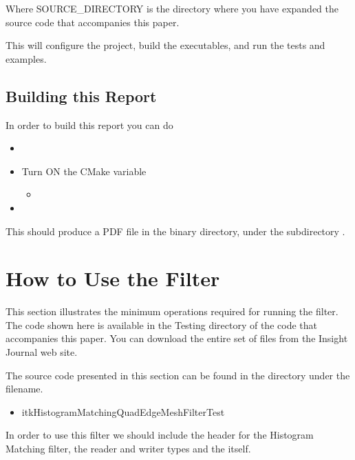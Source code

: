 \documentclass{InsightArticle}
\begin{document}
Where SOURCE\_DIRECTORY is the directory where you have expanded the source
code that accompanies this paper.

This will configure the project, build the executables, and run the tests and
examples. 


\subsection{Building this Report}

In order to build this report you can do

\begin{itemize}
\item {}
\item Turn ON the CMake variable
\begin{itemize}
\item {}
\end{itemize}
\item {}
\end{itemize}

This should produce a PDF file in the binary directory, under the subdirectory
.

\section{How to Use the Filter}

This section illustrates the minimum operations required for running the filter. The code shown here 
is available in the Testing directory of the code that accompanies this paper. You can download the 
entire set of files from the Insight Journal web site.

The source code presented in this section can be found in the  directory under the filename.

\begin{itemize}
\item itkHistogramMatchingQuadEdgeMeshFilterTest
\end{itemize}

In order to use this filter we should include the header for the Histogram Matching filter, 
the reader and writer types and the  itself.

\begin{center}

\end{center}
\end{document}
